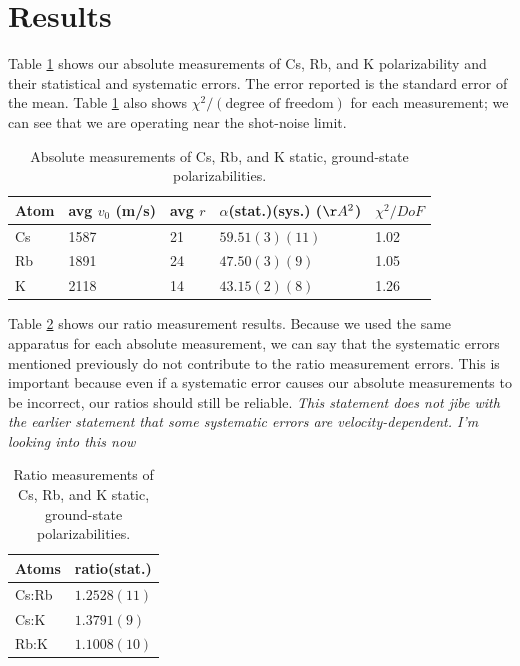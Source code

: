 \documentclass[twocolumn, prl,showpacs,superscriptaddress]{revtex4-1}   %
\newcommand{\polK}{43.15(2)(8)}
\newcommand{\polRb}{47.50(3)(9)}
\newcommand{\polCs}{59.51(3)(11)}
\newcommand{\ratRbK}{1.1008(10)}
\newcommand{\ratCsK}{1.3791(9)}
\newcommand{\ratCsRb}{1.2528(11)}
\begin{document}
\section{Results}

Table \ref{tableAbs} shows our absolute measurements of Cs, Rb, and K polarizability and their statistical and systematic errors. The error reported is the standard error of the mean. Table \ref{tableAbs} also shows $\chi^2/(\text{degree of freedom})$ for each measurement; we can see that we are operating near the shot-noise limit. 

\begingroup
\begin{table}
\caption{\label{tableAbs}Absolute measurements of Cs, Rb, and K static, ground-state polarizabilities.}
\begin{center}
\begin{tabular}{l l l l l}
\hline\hline
Atom & avg $v_0$ (m/s) & avg $r$ & $\alpha$(stat.)(sys.) ($\AA^2$) & $\chi^2/DoF$ \\
\hline
Cs & 1587 & 21 & $\polCs$ & 1.02 \\
Rb & 1891 & 24 & $\polRb$ & 1.05 \\
K  & 2118 & 14 & $\polK$ & 1.26 \\
\hline\hline
\end{tabular}
\end{center}
\end{table}
\endgroup

Table \ref{tableRatio} shows our ratio measurement results. Because we used the same apparatus for each absolute measurement, we can say that the systematic errors mentioned previously do not contribute to the ratio measurement errors. This is important because even if a systematic error causes our absolute measurements to be incorrect, our ratios should still be reliable. \textit{This statement does not jibe with the earlier statement that some systematic errors are velocity-dependent. I'm looking into this now} 

\begingroup
\begin{table}
\caption{\label{tableRatio}Ratio measurements of Cs, Rb, and K static, ground-state polarizabilities.}
\begin{center}
\begin{tabular}{l l}
\hline\hline
Atoms & ratio(stat.) \\
\hline
Cs:Rb & $\ratCsRb$ \\
Cs:K  & $\ratCsK$ \\
Rb:K  & $\ratRbK$ \\
\hline\hline
\end{tabular}
\end{center}
\end{table}
\endgroup
\end{document}
